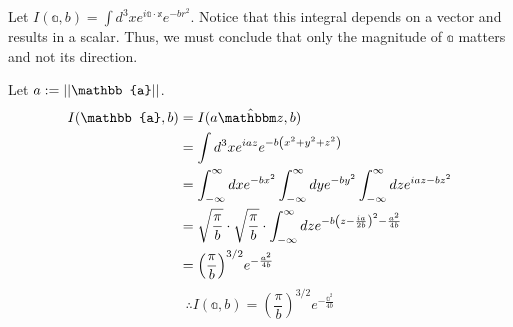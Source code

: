 \item

Let $I(\mathbb{a}, b) = \int d^3x e^{i\mathbb{a} \cdot \mathbb{x}} e^{-br^2}$.
Notice that this integral depends on a vector and results in a scalar.
Thus, we must conclude that only the magnitude of $\mathbb{a}$ matters and not its direction.

Let $a := \norm{\mathbb{a}}$.
\begin{align*}
	I(\mathbb{a}, b)
	 & = I(a \zhat, b)                                                                     \\
	 & = \int d^3 x e^{iaz} e^{-b \left( x^2 + y^2 + z^2 \right)}                          \\
	 & = \int_{-\infty}^{\infty} dx e^{-bx^2}
	\int_{-\infty}^{\infty} dy e^{-by^2}
	\int_{-\infty}^{\infty} dz e^{iaz - bz^2}                                              \\
	 & = \sqrt{\frac{\pi}{b}} \cdot \sqrt{\frac{\pi}{b}} \cdot
	\int_{-\infty}^{\infty} dz e^{-b{\left( z - \frac{ia}{2b} \right)}^2 - \frac{a^2}{4b}} \\
	 & = {\left( \frac{\pi}{b} \right)}^{3/2} e^{-\frac{a^2}{4b}}
\end{align*}
\[
	\therefore I(\mathbb{a}, b) = {\left( \frac{\pi}{b} \right)}^{3/2} e^{-\frac{\mathbb{a}^2}{4b}}
\]